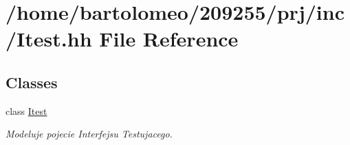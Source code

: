 \hypertarget{_itest_8hh}{\section{/home/bartolomeo/209255/prj/inc/\-Itest.hh File Reference}
\label{_itest_8hh}
}
\subsection*{Classes}
\begin{DoxyCompactItemize}
\item 
class \hyperlink{class_itest}{Itest}
\begin{DoxyCompactList}\small\item\em Modeluje pojecie Interfejsu Testujacego. \end{DoxyCompactList}\end{DoxyCompactItemize}
